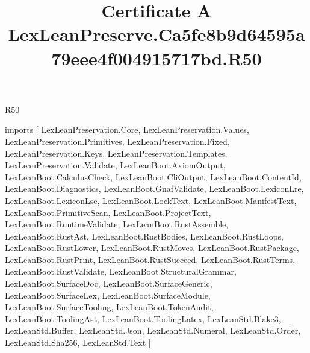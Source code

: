 \begin{lexlean}{R50}
\title{Certificate A LexLeanPreserve.Ca5fe8b9d64595a79eee4f004915717bd.R50}
\begin{coremodule}
imports [
  LexLeanPreservation.Core,
  LexLeanPreservation.Values,
  LexLeanPreservation.Primitives,
  LexLeanPreservation.Fixed,
  LexLeanPreservation.Keys,
  LexLeanPreservation.Templates,
  LexLeanPreservation.Validate,
  LexLeanBoot.AxiomOutput,
  LexLeanBoot.CalculusCheck,
  LexLeanBoot.CliOutput,
  LexLeanBoot.ContentId,
  LexLeanBoot.Diagnostics,
  LexLeanBoot.GnafValidate,
  LexLeanBoot.LexiconLre,
  LexLeanBoot.LexiconLse,
  LexLeanBoot.LockText,
  LexLeanBoot.ManifestText,
  LexLeanBoot.PrimitiveScan,
  LexLeanBoot.ProjectText,
  LexLeanBoot.RuntimeValidate,
  LexLeanBoot.RustAssemble,
  LexLeanBoot.RustAst,
  LexLeanBoot.RustBodies,
  LexLeanBoot.RustLoops,
  LexLeanBoot.RustLower,
  LexLeanBoot.RustMoves,
  LexLeanBoot.RustPackage,
  LexLeanBoot.RustPrint,
  LexLeanBoot.RustSucceed,
  LexLeanBoot.RustTerms,
  LexLeanBoot.RustValidate,
  LexLeanBoot.StructuralGrammar,
  LexLeanBoot.SurfaceDoc,
  LexLeanBoot.SurfaceGeneric,
  LexLeanBoot.SurfaceLex,
  LexLeanBoot.SurfaceModule,
  LexLeanBoot.SurfaceTooling,
  LexLeanBoot.TokenAudit,
  LexLeanBoot.ToolingAst,
  LexLeanBoot.ToolingLatex,
  LexLeanStd.Blake3,
  LexLeanStd.Buffer,
  LexLeanStd.Json,
  LexLeanStd.Numeral,
  LexLeanStd.Order,
  LexLeanStd.Sha256,
  LexLeanStd.Text
]


\end{coremodule}
\end{lexlean}
